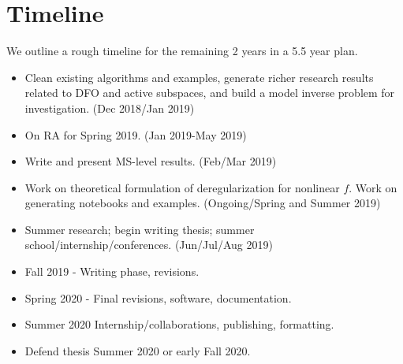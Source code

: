 \documentclass[11pt]{beamer}
\begin{document}
\section{Timeline}
\begin{frame}

We outline a rough timeline for the remaining 2 years in a 5.5 year plan.

\begin{itemize}
\small

\item Clean existing algorithms and examples, generate richer research results related to DFO and active subspaces, and build a model inverse problem for investigation. (Dec 2018/Jan 2019)

\item On RA for Spring 2019. (Jan 2019-May 2019)

\item Write and present MS-level results. (Feb/Mar 2019)

\item Work on theoretical formulation of deregularization for nonlinear $f$. Work on generating notebooks and examples. (Ongoing/Spring and Summer 2019)

\item Summer research; begin writing thesis; summer school/internship/conferences. (Jun/Jul/Aug 2019)

\item Fall 2019 - Writing phase, revisions. 

\item Spring 2020 - Final revisions, software, documentation.

\item Summer 2020 Internship/collaborations, publishing, formatting.

\item Defend thesis Summer 2020 or early Fall 2020.


\end{itemize}


\end{frame}



\end{document}

